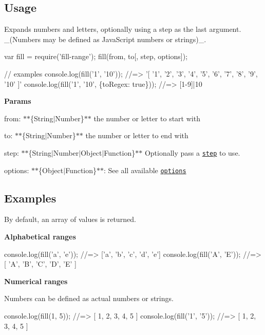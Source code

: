 \subsection*{Usage}

Expands numbers and letters, optionally using a {\ttfamily step} as the last argument. \+\_\+(\+Numbers may be defined as Java\+Script numbers or strings)\+\_\+.


\begin{DoxyCode}
var fill = require('fill-range');
fill(from, to[, step, options]);

// examples
console.log(fill('1', '10'));                  //=> '[ '1', '2', '3', '4', '5', '6', '7', '8', '9', '10' ]'
console.log(fill('1', '10', \{toRegex: true\})); //=> [1-9]|10
\end{DoxyCode}


{\bfseries Params}


\begin{DoxyItemize}
\item {\ttfamily from}\+: $\ast$$\ast$\{String$\vert$\+Number\}$\ast$$\ast$ the number or letter to start with
\item {\ttfamily to}\+: $\ast$$\ast$\{String$\vert$\+Number\}$\ast$$\ast$ the number or letter to end with
\item {\ttfamily step}\+: $\ast$$\ast$\{String$\vert$\+Number$\vert$\+Object$\vert$\+Function\}$\ast$$\ast$ Optionally pass a \href{#optionsstep}{\tt step} to use.
\item {\ttfamily options}\+: $\ast$$\ast$\{Object$\vert$\+Function\}$\ast$$\ast$\+: See all available \href{#options}{\tt options}
\end{DoxyItemize}

\subsection*{Examples}

By default, an array of values is returned.

{\bfseries Alphabetical ranges}


\begin{DoxyCode}
console.log(fill('a', 'e')); //=> ['a', 'b', 'c', 'd', 'e']
console.log(fill('A', 'E')); //=> [ 'A', 'B', 'C', 'D', 'E' ]
\end{DoxyCode}


{\bfseries Numerical ranges}

Numbers can be defined as actual numbers or strings.


\begin{DoxyCode}
console.log(fill(1, 5));     //=> [ 1, 2, 3, 4, 5 ]
console.log(fill('1', '5')); //=> [ 1, 2, 3, 4, 5 ]
\end{DoxyCode}


